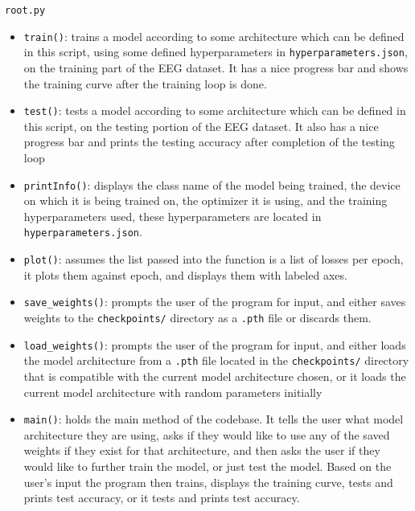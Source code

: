 \documentclass[]{report}
\begin{document}
\texttt{root.py}
\begin{itemize}
	\item \texttt{train()}: trains a model according to some architecture which can be defined in this script, using some defined hyperparameters in \texttt{hyperparameters.json}, on the training part of the EEG dataset. It has a nice progress bar and shows the training curve after the training loop is done.
	
	\item \texttt{test()}: tests a model according to some architecture which can be defined in this script, on the testing portion of the EEG dataset. It also has a nice progress bar and prints the testing accuracy after completion of the testing loop
	
	\item \texttt{printInfo()}: displays the class name of the model being trained, the device on which it is being trained on, the optimizer it is using, and the training hyperparameters used, these hyperparameters are located in \texttt{hyperparameters.json}.
	
	\item \texttt{plot()}: assumes the list passed into the function is a list of losses per epoch, it plots them against epoch, and displays them with labeled axes.
	
	\item \texttt{save\_weights()}: prompts the user of the program for input, and either saves weights to the \texttt{checkpoints/} directory as a \texttt{.pth} file or discards them.
	
	\item \texttt{load\_weights()}: prompts the user of the program for input, and either loads the model architecture from a \texttt{.pth} file located in the \texttt{checkpoints/} directory that is compatible with the current model architecture chosen, or it loads the current model architecture with random parameters initially
	
	\item \texttt{main()}: holds the main method of the codebase. It tells the user what model architecture they are using, asks if they would like to use any of the saved weights if they exist for that architecture, and then asks the user if they would like to further train the model, or just test the model. Based on the user’s input the program then trains, displays the training curve, tests and prints test accuracy, or it tests and prints test accuracy.	
\end{itemize}
\end{document}
